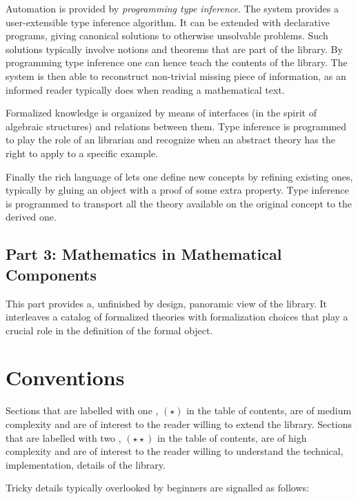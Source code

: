 Automation is provided by \emph{programming type inference}.
The \Coq{} system provides a user-extensible type inference
algorithm.  It can be extended with declarative programs,
giving canonical solutions to otherwise unsolvable problems.
Such solutions typically involve notions and theorems that
are part of the \mcbMC{} library.  By programming type inference
one can hence teach \Coq{} the contents of the library.  The system
is then able to reconstruct non-trivial missing piece of information,
as an informed reader typically does when reading a mathematical text.

Formalized knowledge is organized by means of interfaces (in the spirit of
algebraic structures) and relations between them.  Type inference is programmed
to play the role of an librarian and recognize when an abstract theory has the
right to apply to a specific example.

Finally the rich language of \Coq{} lets one define new concepts
by refining existing ones, typically by gluing an object with
a proof of some extra property.  Type inference is programmed
to transport all the theory available on
the original concept to the derived one.

\subsection{Part 3: Mathematics in Mathematical Components}

This part provides a, unfinished by design, panoramic view of the
\mcbMC{} library.  It interleaves a catalog of formalized theories with
formalization choices that play a crucial role in the
definition of the formal object.

\section{Conventions}

Sections that are labelled with one \coqhead{0.3cm}, $(\star)$ in the table of
contents, are of medium complexity and are of interest to the reader willing
to extend the \mcbMC{} library.  Sections that are labelled with two
\coqhead{0.3cm}\coqhead{0.3cm}, $(\star\star)$ in the table of
contents, are of high complexity and are of interest to the reader willing
to understand the technical, implementation, details of the \mcbMC{} library.

Tricky details typically overlooked by beginners are signalled as follows:

